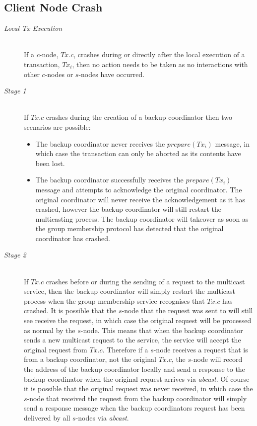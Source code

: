     \subsection*{Client Node Crash}
	\begin{description}
         \item[\emph{Local Tx Execution}]  \hfill \\
         If a $c$-node, $Tx.c$, crashes during or directly after the local execution of a transaction, $Tx_i$, then no action needs to be taken as no interactions with other $c$-nodes or $s$-nodes have occurred.  
		
		\item[\emph{Stage 1}]  \hfill \\
		If $Tx.c$ crashes during the creation of a backup coordinator then two scenarios are possible:
		    \begin{itemize}
			    \item    The backup coordinator never receives the $prepare(Tx_i)$ message, in which case the transaction  can only be aborted as its contents have been lost.  
			    \item    The backup coordinator successfully receives the $prepare(Tx_i)$ message and attempts to acknowledge the original coordinator.  The original coordinator will never receive the acknowledgement as it has crashed, however the backup coordinator will still restart the multicasting process. The backup coordinator will takeover as soon as the group membership protocol has detected that the original coordinator has crashed.
		    \end{itemize}     
		    
		\item[\emph{Stage 2}]  \hfill \\
        If $Tx.c$ crashes before or during the sending of a request to the multicast service, then the backup coordinator will simply restart the multicast process when the group membership service recognises that $Tx.c$ has crashed.  It is possible that the $s$-node that the request was sent to will still see receive the request, in which case the original request will be processed as normal by the $s$-node.  This means that when the backup coordinator sends a new multicast request to the service, the service will accept the original request from $Tx.c$.  Therefore if a $s$-node receives a request that is from a backup coordinator, not the original $Tx.c$, the $s$-node will record the address of the backup coordinator locally and send a response to the backup coordinator when the original request arrives via \emph{abcast}.  Of course it is possible that the original request was never received, in which case the $s$-node that received the request from the backup coordinator will simply send a response message when the backup coordinators request has been delivered by all $s$-nodes via \emph{abcast}.  
        

\end{description}
